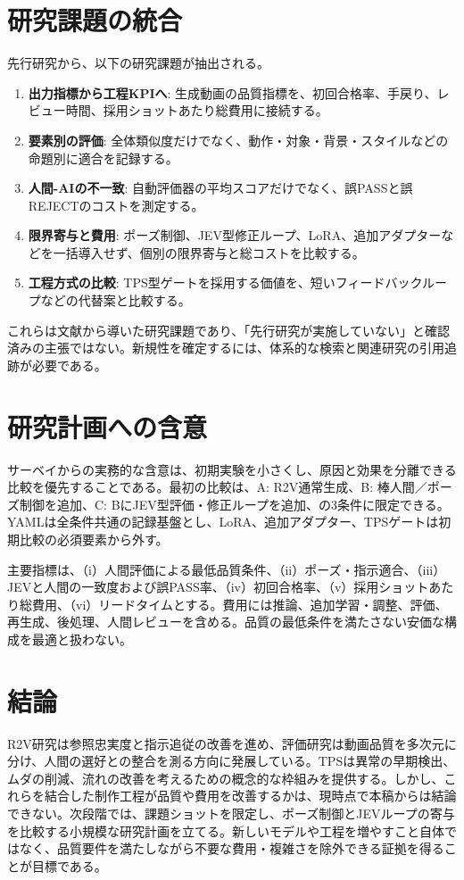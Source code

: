 \documentclass[11pt,a4paper]{article}
\begin{document}
\section{研究課題の統合}
先行研究から、以下の研究課題が抽出される。
\begin{enumerate}
\item \textbf{出力指標から工程KPIへ}: 生成動画の品質指標を、初回合格率、手戻り、レビュー時間、採用ショットあたり総費用に接続する。
\item \textbf{要素別の評価}: 全体類似度だけでなく、動作・対象・背景・スタイルなどの命題別に適合を記録する。
\item \textbf{人間-AIの不一致}: 自動評価器の平均スコアだけでなく、誤PASSと誤REJECTのコストを測定する。
\item \textbf{限界寄与と費用}: ポーズ制御、JEV型修正ループ、LoRA、追加アダプターなどを一括導入せず、個別の限界寄与と総コストを比較する。
\item \textbf{工程方式の比較}: TPS型ゲートを採用する価値を、短いフィードバックループなどの代替案と比較する。
\end{enumerate}

これらは文献から導いた研究課題であり、「先行研究が実施していない」と確認済みの主張ではない。新規性を確定するには、体系的な検索と関連研究の引用追跡が必要である。

\section{研究計画への含意}
サーベイからの実務的な含意は、初期実験を小さくし、原因と効果を分離できる比較を優先することである。最初の比較は、A: R2V通常生成、B: 棒人間／ポーズ制御を追加、C: BにJEV型評価・修正ループを追加、の3条件に限定できる。YAMLは全条件共通の記録基盤とし、LoRA、追加アダプター、TPSゲートは初期比較の必須要素から外す。

主要指標は、（i）人間評価による最低品質条件、（ii）ポーズ・指示適合、（iii）JEVと人間の一致度および誤PASS率、（iv）初回合格率、（v）採用ショットあたり総費用、（vi）リードタイムとする。費用には推論、追加学習・調整、評価、再生成、後処理、人間レビューを含める。品質の最低条件を満たさない安価な構成を最適と扱わない。

\section{結論}
R2V研究は参照忠実度と指示追従の改善を進め、評価研究は動画品質を多次元に分け、人間の選好との整合を測る方向に発展している。TPSは異常の早期検出、ムダの削減、流れの改善を考えるための概念的な枠組みを提供する。しかし、これらを結合した制作工程が品質や費用を改善するかは、現時点で本稿からは結論できない。次段階では、課題ショットを限定し、ポーズ制御とJEVループの寄与を比較する小規模な研究計画を立てる。新しいモデルや工程を増やすこと自体ではなく、品質要件を満たしながら不要な費用・複雑さを除外できる証拠を得ることが目標である。
\end{document}
